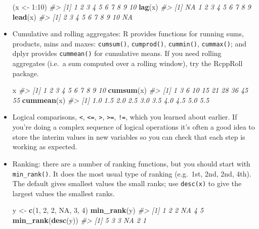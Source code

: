 \documentclass[]{book}
\newenvironment{Shaded}{\begin{snugshade}}{\end{snugshade}}
\newcommand{\KeywordTok}[1]{\textcolor[rgb]{0.13,0.29,0.53}{\textbf{{#1}}}}
\newcommand{\DecValTok}[1]{\textcolor[rgb]{0.00,0.00,0.81}{{#1}}}
\newcommand{\StringTok}[1]{\textcolor[rgb]{0.31,0.60,0.02}{{#1}}}
\newcommand{\CommentTok}[1]{\textcolor[rgb]{0.56,0.35,0.01}{\textit{{#1}}}}
\newcommand{\OtherTok}[1]{\textcolor[rgb]{0.56,0.35,0.01}{{#1}}}
\newcommand{\NormalTok}[1]{{#1}}
\begin{document}
\begin{itemize}
\begin{Shaded}
\begin{Highlighting}[]
\NormalTok{(x <-}\StringTok{ }\DecValTok{1}\NormalTok{:}\DecValTok{10}\NormalTok{)}
\CommentTok{#>  [1]  1  2  3  4  5  6  7  8  9 10}
\KeywordTok{lag}\NormalTok{(x)}
\CommentTok{#>  [1] NA  1  2  3  4  5  6  7  8  9}
\KeywordTok{lead}\NormalTok{(x)}
\CommentTok{#>  [1]  2  3  4  5  6  7  8  9 10 NA}
\end{Highlighting}
\end{Shaded}
\item
  Cumulative and rolling aggregates: R provides functions for running
  sums, products, mins and maxes: \texttt{cumsum()}, \texttt{cumprod()},
  \texttt{cummin()}, \texttt{cummax()}; and dplyr provides
  \texttt{cummean()} for cumulative means. If you need rolling
  aggregates (i.e.~a sum computed over a rolling window), try the
  RcppRoll package.

\begin{Shaded}
\begin{Highlighting}[]
\NormalTok{x}
\CommentTok{#>  [1]  1  2  3  4  5  6  7  8  9 10}
\KeywordTok{cumsum}\NormalTok{(x)}
\CommentTok{#>  [1]  1  3  6 10 15 21 28 36 45 55}
\KeywordTok{cummean}\NormalTok{(x)}
\CommentTok{#>  [1] 1.0 1.5 2.0 2.5 3.0 3.5 4.0 4.5 5.0 5.5}
\end{Highlighting}
\end{Shaded}
\item
  Logical comparisons, \texttt{\textless{}}, \texttt{\textless{}=},
  \texttt{\textgreater{}}, \texttt{\textgreater{}=}, \texttt{!=}, which
  you learned about earlier. If you're doing a complex sequence of
  logical operations it's often a good idea to store the interim values
  in new variables so you can check that each step is working as
  expected.
\item
  Ranking: there are a number of ranking functions, but you should start
  with \texttt{min\_rank()}. It does the most usual type of ranking
  (e.g.~1st, 2nd, 2nd, 4th). The default gives smallest values the small
  ranks; use \texttt{desc(x)} to give the largest values the smallest
  ranks.

\begin{Shaded}
\begin{Highlighting}[]
\NormalTok{y <-}\StringTok{ }\KeywordTok{c}\NormalTok{(}\DecValTok{1}\NormalTok{, }\DecValTok{2}\NormalTok{, }\DecValTok{2}\NormalTok{, }\OtherTok{NA}\NormalTok{, }\DecValTok{3}\NormalTok{, }\DecValTok{4}\NormalTok{)}
\KeywordTok{min_rank}\NormalTok{(y)}
\CommentTok{#> [1]  1  2  2 NA  4  5}
\KeywordTok{min_rank}\NormalTok{(}\KeywordTok{desc}\NormalTok{(y))}
\CommentTok{#> [1]  5  3  3 NA  2  1}
\end{Highlighting}
\end{Shaded}


\end{itemize}
\end{document}
